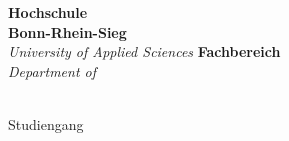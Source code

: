 \begin{titlepage}
    \hfill
    \begin{minipage}[t]{.825\linewidth}
        \raggedright\Large
        \begin{spacing}{0.90}
            \textbf{Hochschule\\Bonn-Rhein-Sieg}\\
            \textit{University of Applied Sciences}
            \linebreak
            \linebreak
            \textbf{Fachbereich \ThesisStudyCourseDepartmentGerman}\\
            \textit{Department of \ThesisStudyCourseDepartment}
        \end{spacing}
    \end{minipage}

    \vspace{4\baselineskip}

    \begin{center}
        \begin{spacing}{1.25}
            \fontsize{26}{26}\normalfont\ThesisSubjectType\\
            \large\normalfont Studiengang \ThesisType~\ThesisStudyCourseGerman\\

            \vspace{4\baselineskip}

            \fontsize{20}{20}\normalfont\ThesisTitle\\
        \end{spacing}
    \end{center}

    \vfill


\end{titlepage}
